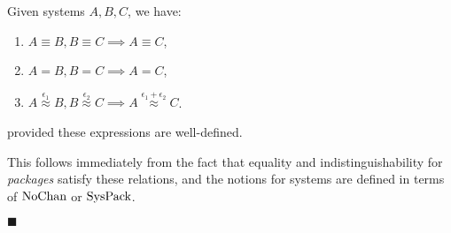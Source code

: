 \begin{lemma}
  \label{thm:system_trans}
  Given systems $A, B, C$, we have:
  \begin{enumerate}
    \item $A \equiv B, B \equiv C \implies A \equiv C$,
    \item $A = B, B = C \implies A = C$,
    \item $A \overset{\epsilon_1}{\approx} B, B \overset{\epsilon_2}{\approx} C \implies A \overset{\epsilon_1 + \epsilon_2}{\approx} C$.
  \end{enumerate}
  provided these expressions are well-defined.

   This follows immediately from the fact that equality and indistinguishability
  for \emph{packages} satisfy these relations, and the notions for systems are
  defined in terms of $\text{NoChan}$ or $\text{SysPack}$.

  $\blacksquare$
\end{lemma}

